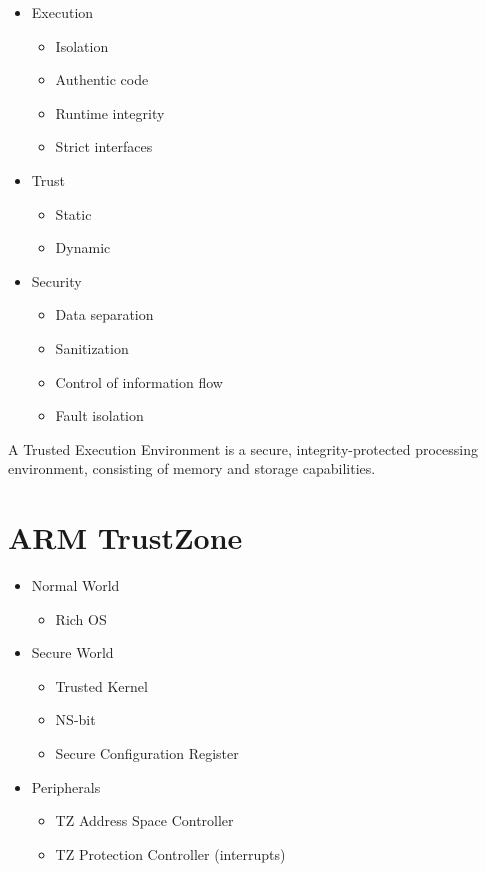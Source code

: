 \documentclass{report}
\begin{document}
\begin{itemize}
\item Execution \begin{itemize}
\item Isolation
\item Authentic code
\item Runtime integrity
\item Strict interfaces
\end{itemize} 
\item Trust \begin{itemize}
\item Static
\item Dynamic
\end{itemize}
\item Security \begin{itemize}
\item Data separation
\item Sanitization
\item Control of information flow
\item Fault isolation
\end{itemize}
\end{itemize}

A Trusted Execution Environment is a secure, integrity-protected processing environment, consisting of memory and storage capabilities.

\section{ARM TrustZone}

\begin{itemize}
\item Normal World \begin{itemize}
\item Rich OS
\end{itemize}
\item Secure World \begin{itemize}
\item Trusted Kernel
\item NS-bit
\item Secure Configuration Register
\end{itemize}
\item Peripherals \begin{itemize}
\item TZ Address Space Controller
\item TZ Protection Controller (interrupts)
\end{itemize}
\end{itemize}
\end{document}
